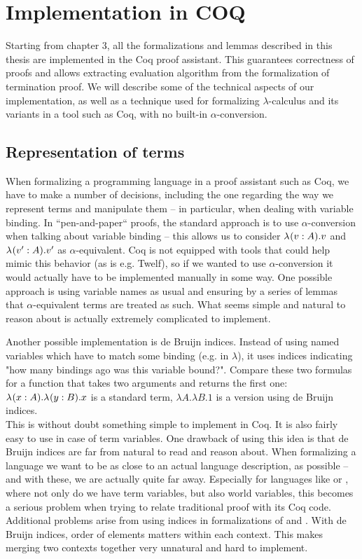 \chapter{Implementation in COQ}\label{appendix:coq}

Starting from chapter 3, all the formalizations and lemmas described in this thesis are implemented in the Coq proof assistant. This guarantees correctness of proofs and allows extracting evaluation algorithm from the formalization of termination proof. We will describe some of the technical aspects of our implementation, as well as a technique used for formalizing $\lambda$-calculus and its variants in a tool such as Coq, with no built-in $\alpha$-conversion.

\section{Representation of terms}

When formalizing a programming language in a proof assistant such as Coq, we have to make a number of decisions, including the one regarding the way we represent terms and manipulate them -- in particular, when dealing with variable binding. In ``pen-and-paper`` proofs, the standard approach is to use $\alpha$-conversion when talking about variable binding -- this allows us to consider $\mbox{$\lambda_{} (v: A). v$}$ and $\mbox{$\lambda_{} (v': A). v'$}$ as $\alpha$-equivalent. Coq is not equipped with tools that could help mimic this behavior (as is e.g. Twelf), so if we wanted to use $\alpha$-conversion it would actually have to be implemented manually in some way. One possible approach is using variable names as usual and ensuring by a series of lemmas that $\alpha$-equivalent terms are treated as such. What seems simple and natural to reason about is actually extremely complicated to implement.

Another possible implementation is de Bruijn indices. Instead of using named variables which have to match some binding (e.g. in $\lambda$), it uses indices indicating "how many bindings ago was this variable bound?". Compare these two formulas for a function that takes two arguments and returns the first one: $\mbox{$\lambda_{} (x: A). \mbox{$\lambda_{} (y: B). x$}$}$ is a standard term, $\lambda {A}.{\lambda {B}.{1}}$ is a version using de Bruijn indices.\\
This is without doubt something simple to implement in Coq. It is also fairly easy to use in case of term variables. One drawback of using this idea is that de Bruijn indices are far from natural to read and reason about. When formalizing a language we want to be as close to an actual language description, as possible -- and with these, we are actually quite far away. Especially for languages like \langHyb{} or \langL{}, where not only do we have term variables, but also world variables, this becomes a serious problem when trying to relate traditional proof with its Coq code. Additional problems arise from using indices in formalizations of \langLF{} and \langHyb{}. With de Bruijn indices, order of elements matters within each context. This makes merging two contexts together very unnatural and hard to implement.\\

